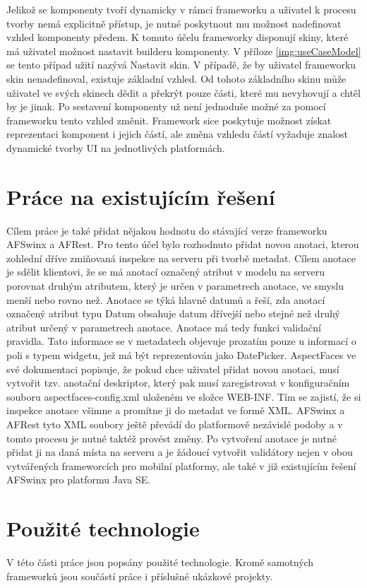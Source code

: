 Jelikož se komponenty tvoří dynamicky v rámci frameworku a uživatel k procesu tvorby nemá explicitně přístup, je nutné poskytnout mu možnost nadefinovat vzhled komponenty předem. K tomuto účelu frameworky disponují skiny, které má uživatel možnost nastavit builderu komponenty. V příloze \ref{img:useCaseModel} se tento případ užití nazývá Nastavit skin. V případě, že by uživatel frameworku skin nenadefinoval, existuje základní vzhled. Od tohoto základního skinu může uživatel ve svých skinech dědit a překrýt pouze části, které mu nevyhovují a chtěl by je jinak. Po sestavení komponenty už není jednoduše možné za pomocí frameworku tento vzhled změnit. Framework sice poskytuje možnost získat reprezentaci komponent i jejich částí, ale změna vzhledu částí vyžaduje znalost dynamické tvorby UI na jednotlivých platformách.

\section{Práce na existujícím řešení}
Cílem práce je také přidat nějakou hodnotu do stávající verze frameworku AFSwinx a AFRest. Pro tento účel bylo rozhodnuto přidat novou anotaci, kterou zohlední dříve zmiňovaná inspekce na serveru při tvorbě metadat. Cílem anotace je sdělit klientovi, že se má anotací označený atribut v modelu na serveru porovnat druhým atributem, který je určen v parametrech anotace, ve smyslu menší nebo rovno než. Anotace se týká hlavně datumů a řeší, zda anotací označený atribut typu Datum obsahuje datum dřívejší nebo stejné než druhý atribut určený v parametrech anotace. Anotace má tedy funkci validační pravidla. Tato informace se v metadatech objevuje prozatím pouze u informací o poli s typem widgetu, jež má být reprezentován jako DatePicker. AspectFaces \cite{aspect-faces} ve své dokumentaci popisuje, že pokud chce uživatel přidat novou anotaci, musí vytvořit tzv. anotační deskriptor, který pak musí zaregistrovat v konfiguračním souboru aspectfaces-config.xml uloženém ve složce WEB-INF. Tím se zajistí, že si inspekce anotace všimne a promítne ji do metadat ve formě XML. AFSwinx a AFRest tyto XML soubory ještě převádí do platformově nezávislé podoby \cite{tomasek-thesis} a v tomto procesu je nutné taktéž provést změny. Po vytvoření anotace je nutné přidat ji na daná místa na serveru a je žádoucí vytvořit validátory nejen v obou vytvářených frameworcích pro mobilní platformy, ale také v již existujícím řešení AFSwinx pro platformu Java SE.

\section{Použité technologie}
V této části práce jsou popsány použité technologie. Kromě samotných frameworků jsou součástí práce i příslušné ukázkové projekty.

